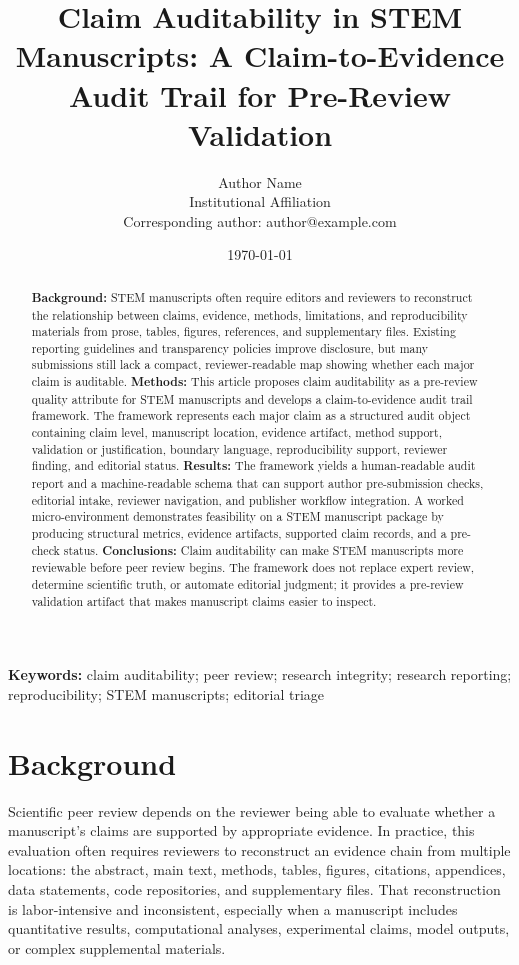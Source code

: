 \documentclass[12pt]{article}
\title{Claim Auditability in STEM Manuscripts: A Claim-to-Evidence Audit Trail for Pre-Review Validation}
\author{Author Name\\Institutional Affiliation\\Corresponding author: author@example.com}
\date{\today}
\begin{document}
\maketitle
\doublespacing
\linenumbers

\begin{abstract}
\textbf{Background:} STEM manuscripts often require editors and reviewers to reconstruct the relationship between claims, evidence, methods, limitations, and reproducibility materials from prose, tables, figures, references, and supplementary files. Existing reporting guidelines and transparency policies improve disclosure, but many submissions still lack a compact, reviewer-readable map showing whether each major claim is auditable. 
\textbf{Methods:} This article proposes claim auditability as a pre-review quality attribute for STEM manuscripts and develops a claim-to-evidence audit trail framework. The framework represents each major claim as a structured audit object containing claim level, manuscript location, evidence artifact, method support, validation or justification, boundary language, reproducibility support, reviewer finding, and editorial status. 
\textbf{Results:} The framework yields a human-readable audit report and a machine-readable schema that can support author pre-submission checks, editorial intake, reviewer navigation, and publisher workflow integration. A worked micro-environment demonstrates feasibility on a STEM manuscript package by producing structural metrics, evidence artifacts, supported claim records, and a pre-check status. 
\textbf{Conclusions:} Claim auditability can make STEM manuscripts more reviewable before peer review begins. The framework does not replace expert review, determine scientific truth, or automate editorial judgment; it provides a pre-review validation artifact that makes manuscript claims easier to inspect.
\end{abstract}

\textbf{Keywords:} claim auditability; peer review; research integrity; research reporting; reproducibility; STEM manuscripts; editorial triage

\section{Background}

Scientific peer review depends on the reviewer being able to evaluate whether a manuscript's claims are supported by appropriate evidence. In practice, this evaluation often requires reviewers to reconstruct an evidence chain from multiple locations: the abstract, main text, methods, tables, figures, citations, appendices, data statements, code repositories, and supplementary files. That reconstruction is labor-intensive and inconsistent, especially when a manuscript includes quantitative results, computational analyses, experimental claims, model outputs, or complex supplemental materials.
\end{document}
